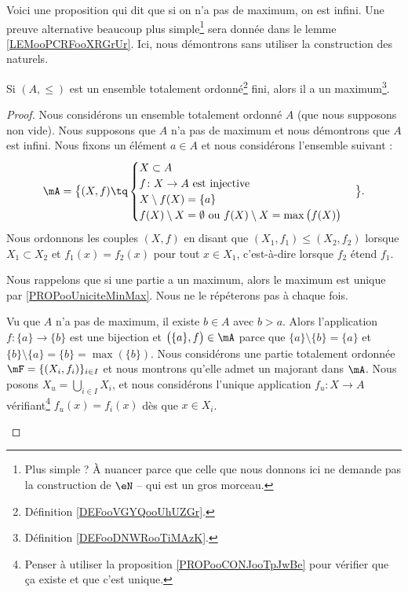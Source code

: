 Voici une proposition qui dit que si on n'a pas de maximum, on est infini. Une preuve alternative beaucoup plus simple\footnote{Plus simple ? À nuancer parce que celle que nous donnons ici ne demande pas la construction de \( \eN\) -- qui est un gros morceau.} sera donnée dans le lemme \ref{LEMooPCRFooXRGrUr}. Ici, nous démontrons sans utiliser la construction des naturels.
\begin{proposition}	\label{PROPooVZRVooAncMjb}
	Si \( (A,\leq)\) est un ensemble totalement ordonné\footnote{Définition \ref{DEFooVGYQooUhUZGr}.} fini, alors il a un maximum\footnote{Définition \ref{DEFooDNWRooTiMAzK}.}.
\end{proposition}

\begin{proof}
	Nous considérons un ensemble totalement ordonné \( A\) (que nous supposons non vide). Nous supposons que \( A\) n'a pas de maximum et nous démontrons que \( A\) est infini. Nous fixons un élément \( a\in A\) et nous considérons l'ensemble suivant :
	\begin{equation}
		\mA=\big\{ (X,f)\tq  \begin{cases}
			X\subset A                             \\
			f \colon X\to A  \text{ est injective} \\
			X\setminus f(X)=\{ a \}                \\
			f(X)\setminus X=\emptyset \text{ ou } f(X)\setminus X=\max\big( f(X) \big)
		\end{cases}\big\}.
	\end{equation}
	Nous ordonnons les couples \( (X,f)\) en disant que \( (X_1,f_1)\leq (X_2,f_2)\) lorsque \( X_1\subset X_2\) et \( f_1(x)=f_2(x)\) pour tout \( x\in X_1\), c'est-à-dire lorsque \( f_2\) étend \( f_1\).

	Nous rappelons que si une partie a un maximum, alors le maximum est unique par \ref{PROPooUniciteMinMax}. Nous ne le répéterons pas à chaque fois.

	\begin{subproof}
		Vu que \( A\) n'a pas de maximum, il existe \( b\in A\) avec \( b>a\). Alors l'application \(f \colon \{ a \}\to \{ b \}  \) est une bijection et \( \big( \{ a \},f \big)\in \mA\) parce que \( \{ a \}\setminus\{ b \}=\{ a \}\) et \( \{ b \}\setminus\{ a \}=\{ b \}=\max(\{ b \})\).
		Nous considérons une partie totalement ordonnée \( \mF=\{ (X_i,f_i) \}_{i\in I}\) et nous montrons qu'elle admet un majorant dans \( \mA\). Nous posons \( X_u=\bigcup_{i\in I}X_i\), et nous considérons l'unique application \(f_u \colon X\to A  \) vérifiant\footnote{Penser à utiliser la proposition \ref{PROPooCONJooTpJwBe} pour vérifier que ça existe et que c'est unique.} \( f_u(x)=f_i(x)\) dès que \( x\in X_i\).


\end{subproof}
\end{proof}
